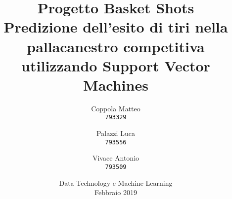 \documentclass[12pt,a4paper]{report}
\begin{document}
\title{%
  \Huge Progetto Basket Shots\\
  \large Predizione dell'esito di tiri nella pallacanestro competitiva utilizzando Support Vector Machines\\
    }
\author{
  Coppola Matteo\\
  \texttt{793329}
  \and
  Palazzi Luca\\
  \texttt{793556}
   \and
  Vivace Antonio\\
  \texttt{793509}
}
\date{Data Technology e Machine Learning \\ Febbraio 2019}
\maketitle

\tableofcontents
\end{document}
